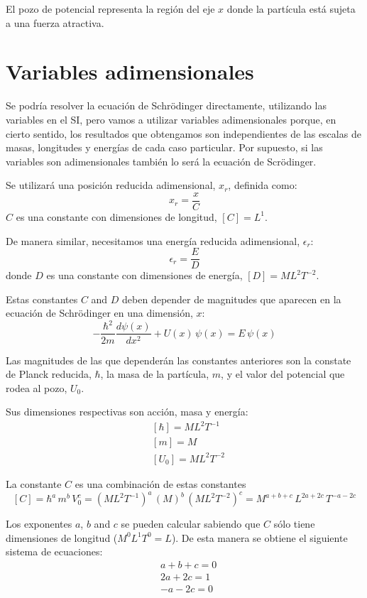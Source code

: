 El pozo de potencial representa la región del eje $x$ donde la partícula
está sujeta a una fuerza atractiva.

\section{Variables adimensionales}
Se podría resolver la ecuación de Schrödinger directamente, utilizando las
variables en el SI, pero vamos a utilizar variables adimensionales porque,
en cierto sentido, los resultados que obtengamos son independientes de
las escalas de masas, longitudes y energías de cada caso particular.
Por supuesto, si las variables son adimensionales también lo será la
ecuación de Scrödinger.

Se utilizará una posición reducida adimensional, $x_r$, definida como:
\begin{equation}
\label{reduced_x}
	x_r = \frac{x}{C}
\end{equation}
$C$ es una constante con dimensiones de longitud, $[C] = L^1$.

De manera similar, necesitamos una energía reducida adimensional, $\epsilon_r$:
\begin{equation}
\label{reduced_e}
	\epsilon_r = \frac{E}{D}
\end{equation}
donde $D$ es una constante con dimensiones de energía, $[D] = ML^2T^{-2}$.

Estas constantes $C$ and $D$ deben depender de magnitudes que aparecen en la
ecuación de Schrödinger en una dimensión, $x$:
\begin{equation}
\label{schro1}
-\frac{\hbar^2}{2m}\frac{d\psi(x)}{dx^2}+U(x)\,\psi(x) = E\,\psi(x)
\end{equation}

Las magnitudes de las que dependerán las constantes anteriores son la
constate de Planck reducida, $\hbar$, la masa de la partícula, $m$, y el
valor del potencial que rodea al pozo, $U_0$.

Sus dimensiones respectivas son acción, masa y energía:
\begin{align*}
&[\hbar] = ML^2T^{-1}\\
&[m] = M\\
&[U_0] = ML^2T^{-2}
\end{align*}

La constante $C$ es una combinación de estas constantes
\[
[C] = \hbar^a \,m^b \,V_0^c =
(ML^2T^{-1})^a \,(M)^b \,(ML^2T^{-2})^c =
M^{a+b+c} \,L^{2a+2c} \,T^{-a-2c}
\]

Los exponentes $a$, $b$ and $c$ se pueden calcular sabiendo que $C$ sólo tiene
dimensiones de longitud ($M^0 L^1 T^0 = L$).
De esta manera se obtiene el siguiente sistema de ecuaciones:
\begin{align*}
&a + b + c = 0\\
&2a+2c = 1\\
&-a-2c = 0
\end{align*}

